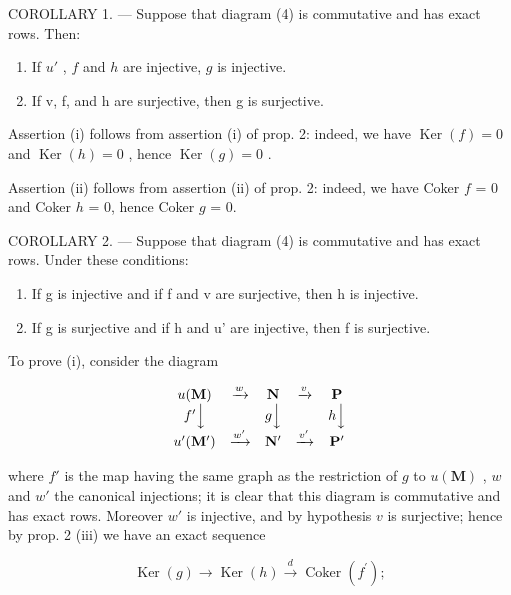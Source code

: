 COROLLARY 1. --- Suppose that diagram (4) is commutative and has exact rows. Then:

\begin{enumerate}
\def\labelenumi{(\roman{enumi})}
\item
  If \(u'\) , \(f\) and \(h\) are injective, \(g\) is injective.
\item
  If v, f, and h are surjective, then g is surjective.
\end{enumerate}

Assertion (i) follows from assertion (i) of prop. 2: indeed, we have \(\operatorname{Ker}(f) = 0\) and \(\operatorname{Ker}(h) = 0\) , hence \(\operatorname{Ker}(g) = 0\) .

Assertion (ii) follows from assertion (ii) of prop. 2: indeed, we have Coker \(f\) = 0 and Coker \(h\) = 0, hence Coker \(g\) = 0.

COROLLARY 2. --- Suppose that diagram (4) is commutative and has exact rows. Under these conditions:

\begin{enumerate}
\def\labelenumi{(\roman{enumi})}
\item
  If g is injective and if f and v are surjective, then h is injective.
\item
  If g is surjective and if h and u' are injective, then f is surjective.
\end{enumerate}

To prove (i), consider the diagram

\[
\begin{array}{c c c c c} u (\mathbf {M}) & \xrightarrow {w} & \mathbf {N} & \xrightarrow {v} & \mathbf {P} \\ f ^ {\prime} \Big \downarrow & & g \Big \downarrow & & h \Big \downarrow \\ u ^ {\prime} (\mathbf {M} ^ {\prime}) & \xrightarrow {w ^ {\prime}} & \mathbf {N} ^ {\prime} & \xrightarrow {v ^ {\prime}} & \mathbf {P} ^ {\prime} \end{array}
\]

where \(f'\) is the map having the same graph as the restriction of \(g\) to \(u(\mathbf{M})\) , \(w\) and \(w'\) the canonical injections; it is clear that this diagram is commutative and has exact rows. Moreover \(w'\) is injective, and by hypothesis \(v\) is surjective; hence by prop. 2 (iii) we have an exact sequence

\[
\operatorname{Ker} (g) \longrightarrow \operatorname{Ker} (h) \xrightarrow {d} \operatorname{Coker} \left(f ^ {\prime}\right);
\]

